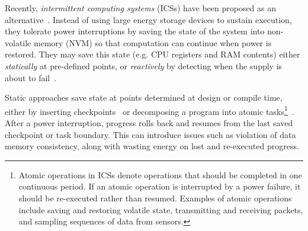 Recently, \textit{intermittent computing systems} (ICSs) have been proposed as an alternative~\cite{doi:10.1098/rsta.2019.0158}. Instead of using large energy storage devices to sustain execution, they tolerate power interruptions by saving the state of the system into non-volatile memory (NVM) so that computation can continue when power is restored. They may save this state (e.g. CPU registers and RAM contents) either \textit{statically} at pre-defined points, or \textit{reactively} by detecting when the supply is about to fail~\cite{doi:10.1098/rsta.2019.0158}.

Static approaches save state at points determined at design or compile time, either by inserting checkpoints~\cite{Ransford:2011:MSS:1950365.1950386, 7944791} or decomposing a program into atomic tasks\footnote{Atomic operations in ICSs denote operations that should be completed in one continuous period. If an atomic operation is interrupted by a power failure, it should be re-executed rather than resumed. Examples of atomic operations include saving and restoring volatile state, transmitting and receiving packets, and sampling sequences of data from sensors.}~\cite{10.1145/3360285, Maeng:2017:AIE:3152284.3133920}. After a power interruption, progress rolls back and resumes from the last saved checkpoint or task boundary. This can introduce issues such as violation of data memory consistency, along with wasting energy on lost and re-executed progress.

